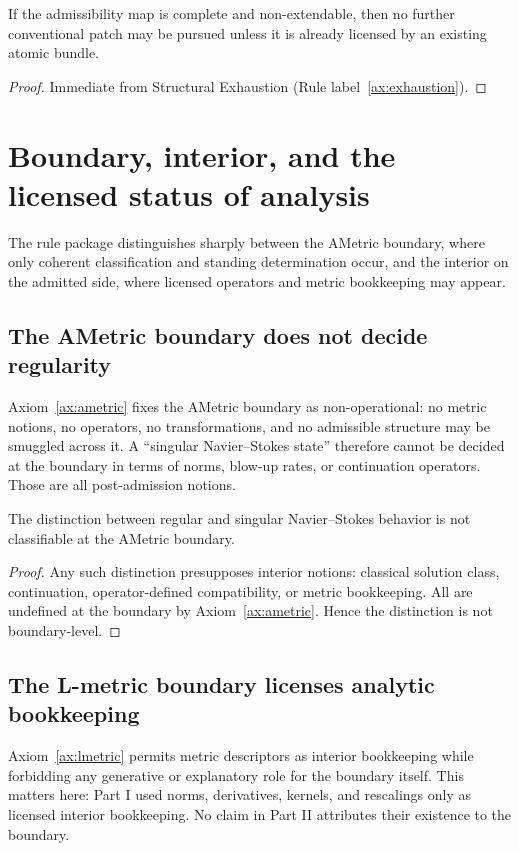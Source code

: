 \begin{corollary}\label{cor:pivot-necessary}
If the admissibility map is complete and non-extendable, then no further conventional patch may be
pursued unless it is already licensed by an existing atomic bundle.
\end{corollary}

\begin{proof}
Immediate from Structural Exhaustion (Rule label~\ref{ax:exhaustion}).
\end{proof}

\section{Boundary, interior, and the licensed status of analysis}
The rule package distinguishes sharply between the AMetric boundary, where only coherent classification
and standing determination occur, and the interior on the admitted side, where licensed operators and metric
bookkeeping may appear.

\subsection{The AMetric boundary does not decide regularity}
Axiom~\ref{ax:ametric} fixes the AMetric boundary as non-operational: no metric notions, no operators, no
transformations, and no admissible structure may be smuggled across it.  A
``singular Navier--Stokes state'' therefore cannot be decided at the boundary in terms of norms,
blow-up rates, or continuation operators. Those are all post-admission notions.

\begin{lemma}\label{lem:boundary-not-enough}
The distinction between regular and singular Navier--Stokes behavior is not classifiable at the
AMetric boundary.
\end{lemma}

\begin{proof}
Any such distinction presupposes interior notions: classical solution class, continuation,
operator-defined compatibility, or metric bookkeeping. All are undefined at the boundary by Axiom~\ref{ax:ametric}.
Hence the distinction is not boundary-level. 
\end{proof}

\subsection{The L-metric boundary licenses analytic bookkeeping}
Axiom~\ref{ax:lmetric} permits metric descriptors as interior bookkeeping while forbidding
any generative or explanatory role for the boundary itself.  This matters here:
Part I used norms, derivatives, kernels, and rescalings only as licensed interior bookkeeping. No
claim in Part II attributes their existence to the boundary.

